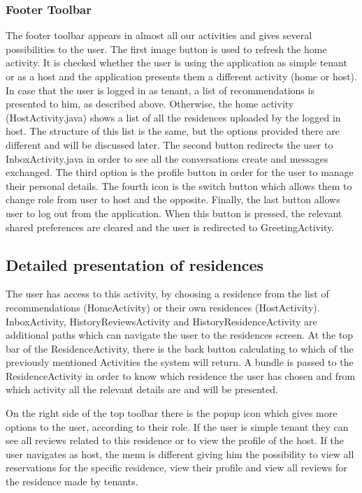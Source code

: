 \documentclass[12pt]{article}
\begin{document}
	\subsubsection{Footer Toolbar}
	The footer toolbar appears in almost all our activities and gives several possibilities to the user. The first image button is used to refresh the home activity. It is checked whether the user is using the application as simple tenant or as a host and the application presents them a different activity (home or host). In case that the user is logged in as tenant, a list of recommendations is presented to him, as described above. Otherwise, the home activity (HostActivity.java) shows a list of all the residences uploaded by the logged in host. The structure of this list is the same, but the options provided there are different and will be discussed later. The second button redirects the user to InboxActivity.java in order to see all the conversations create and messages exchanged. The third option is the profile button in order for the user to manage their personal details. The fourth icon is the switch button which allows them to change role from user to host and the opposite. Finally, the last button allows user to log out from the application. When this button is pressed, the relevant shared preferences are cleared and the user is redirected to GreetingActivity.
	
	\subsection{Detailed presentation of residences}
	The user has access to this activity, by choosing a residence from the list of recommendations (HomeActivity) or their own residences (HostActivity). InboxActivity, HistoryReviewsActivity and HistoryResidenceActivity are additional paths which can navigate the user to the residences screen. At the top bar of the ResidenceActivity, there is the back button calculating to which of the previously mentioned Activities the system will return. A bundle is passed to the ResidenceActivity in order to know which residence the user has chosen and from which activity all the relevant details are and will be presented. 
	
	On the right side of the top toolbar there is the popup icon which gives more options to the user, according to their role. If the user is simple tenant they can see all reviews related to this residence or to view the profile of the host. If the user navigates as host, the menu is different giving him the possibility to view all reservations for the specific residence, view their profile and view all reviews for the residence made by tenants. 
	
\end{document}
